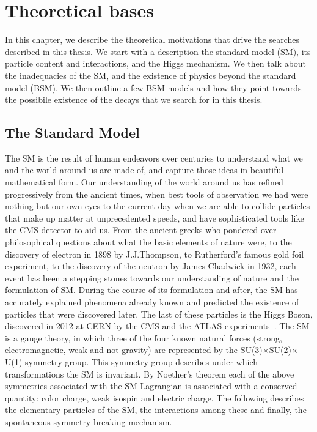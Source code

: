%
%

\chapter{Theoretical bases}
\label{chap:theory}
In this chapter, we describe the theoretical motivations that drive the searches described in this thesis. We start with a description  the standard model (SM), its particle content and interactions, and the Higgs mechanism. We then talk about the inadequacies of the SM, and the existence of physics beyond the standard model (BSM). We then outline a few BSM models and how they point towards the possibile existence of the decays that we search for in this thesis.  

\section{The Standard Model }
\label{sec:SM}
The SM is the result of human endeavors over centuries to understand what we and the world around us are made of, and capture those ideas in beautiful mathematical form. Our understanding of the world around us has refined progressively from the ancient times, when best tools of observation we had were nothing but our own eyes to the current day when we are able to collide particles that make up matter at unprecedented speeds, and have sophisticated tools like the CMS detector to aid us. From the ancient greeks who pondered over philosophical questions about what the basic elements of nature were, to the discovery of electron in 1898 by J.J.Thompson, to Rutherford's famous gold foil experiment, to the discovery of the neutron by James Chadwick in 1932, each event has been a stepping stones towards our understanding of nature and the formulation of SM. During the course of its formulation and after, the SM has accurately explained phenomena already known and  predicted the existence of particles that were discovered later. The last of these particles is the Higgs Boson, discovered in 2012 at CERN by the CMS and the ATLAS experiments~\cite{Aad:2012tfa, Chatrchyan:2012ufa, Chatrchyan:2013lba}. The SM is a gauge theory, in which three of the four known natural forces (strong, electromagnetic, weak and not gravity) are represented by the SU(3)$\times$SU(2)$\times$U(1) symmetry group. This symmetry group describes under which transformations the SM is invariant. By Noether's theorem each of the above symmetries associated with the SM Lagrangian is associated with a conserved quantity: color charge, weak isospin and electric charge. The following describes the elementary particles of the SM, the interactions among these and finally, the spontaneous symmetry breaking mechanism.

